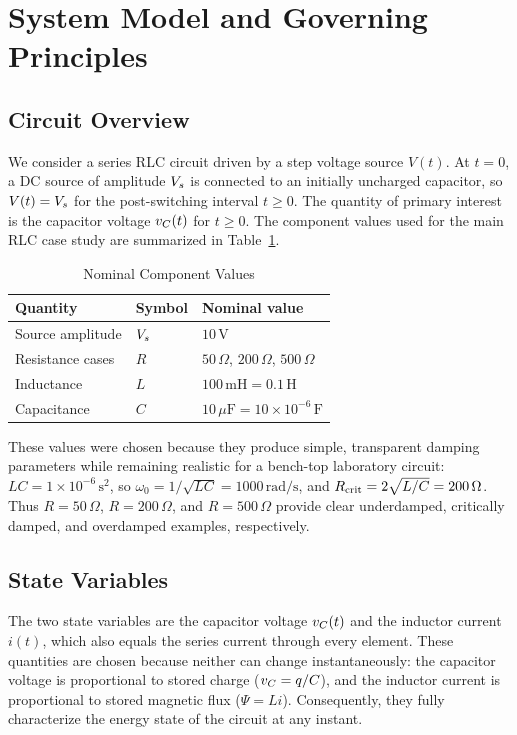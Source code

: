 \section{System Model and Governing Principles}
\label{sec:circuit}

\subsection{Circuit Overview}

We consider a series RLC circuit driven by a step voltage source $V(t)$.
At $t = 0$, a DC source of amplitude $V_s$ is connected to an initially
uncharged capacitor, so $V(t) = V_s$ for the post-switching interval
$t \geq 0$.
The quantity of primary interest is the capacitor voltage $v_C(t)$ for
$t \geq 0$.
The component values used for the main RLC case study are summarized in
Table~\ref{tab:nominal-values}.

\begin{table}[!t]
  \caption{Nominal Component Values}
  \label{tab:nominal-values}
  \centering
  \begin{tabular}{@{}lll@{}}
    \toprule
    Quantity & Symbol & Nominal value \\
    \midrule
    Source amplitude & $V_s$ & $10\,\mathrm{V}$ \\
    Resistance cases & $R$ & $50\,\Omega$, $200\,\Omega$, $500\,\Omega$ \\
    Inductance & $L$ & $100\,\mathrm{mH} = 0.1\,\mathrm{H}$ \\
    Capacitance & $C$ & $10\,\mu\mathrm{F} = 10\times 10^{-6}\,\mathrm{F}$ \\
    \bottomrule
  \end{tabular}
\end{table}

These values were chosen because they produce simple, transparent damping
parameters while remaining realistic for a bench-top laboratory circuit:
$LC = 1\times 10^{-6}\,\mathrm{s}^2$, so
$\omega_0 = 1/\sqrt{LC} = 1000\,\mathrm{rad/s}$, and
$R_{\mathrm{crit}} = 2\sqrt{L/C} = 200\,\Omega$.
Thus $R = 50\,\Omega$, $R = 200\,\Omega$, and
$R = 500\,\Omega$ provide clear underdamped, critically damped, and
overdamped examples, respectively.

\subsection{State Variables}

The two state variables are the capacitor voltage $v_C(t)$ and the inductor
current $i(t)$, which also equals the series current through every element.
These quantities are chosen because neither can change instantaneously:
the capacitor voltage is proportional to stored charge ($v_C = q/C$), and the
inductor current is proportional to stored magnetic flux ($\Psi = Li$).
Consequently, they fully characterize the energy state of the circuit at any
instant.

